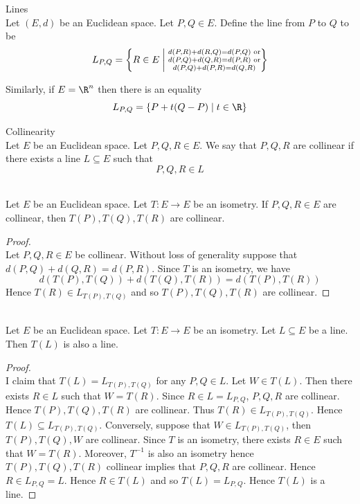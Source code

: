 \documentclass[a4paper]{article}
\begin{document}
\begin{defn}{Lines}{}\\
Let $(E,d)$ be an Euclidean space. Let $P,Q\in E$. Define the line from $P$ to $Q$ to be $$L_{P,Q}=\left\{R\in E\;\bigg{|}\;\substack{d(P,R)+d(R,Q)=d(P,Q)\text{ or}\\d(P,Q)+d(Q,R)=d(P,R)\text{ or}\\d(P,Q)+d(P,R)=d(Q,R)}\right\}$$
\end{defn}

Similarly, if $E=\R^n$ then there is an equality $$L_{P,Q}=\{P+t(Q-P)\;|\;t\in\R\}$$

\begin{defn}{Collinearity}{}\\
Let $E$ be an Euclidean space. Let $P,Q,R\in E$. We say that $P,Q,R$ are collinear if there exists a line $L\subseteq E$ such that $$P,Q,R\in L$$
\end{defn}

\begin{lmm}{}{}\\
Let $E$ be an Euclidean space. Let $T:E\to E$ be an isometry. If $P,Q,R\in E$ are collinear, then $T(P),T(Q),T(R)$ are collinear. 
\begin{proof}\\
Let $P,Q,R\in E$ be collinear. Without loss of generality suppose that $d(P,Q)+d(Q,R)=d(P,R)$. Since $T$ is an isometry, we have $$d(T(P),T(Q))+d(T(Q),T(R))=d(T(P),T(R))$$ Hence $T(R)\in L_{T(P),T(Q)}$ and so $T(P),T(Q),T(R)$ are collinear. 
\end{proof}
\end{lmm}

\begin{lmm}{}{}\\
Let $E$ be an Euclidean space. Let $T:E\to E$ be an isometry. Let $L\subseteq E$ be a line. Then $T(L)$ is also a line. 
\begin{proof}\\
I claim that $T(L)=L_{T(P),T(Q)}$ for any $P,Q\in L$. Let $W\in T(L)$. Then there exists $R\in L$ such that $W=T(R)$. Since $R\in L=L_{P,Q}$, $P,Q,R$ are collinear. Hence $T(P),T(Q),T(R)$ are collinear. Thus $T(R)\in L_{T(P),T(Q)}$. Hence $T(L)\subseteq L_{T(P),T(Q)}$. Conversely, suppose that $W\in L_{T(P),T(Q)}$, then $T(P),T(Q),W$ are collinear. Since $T$ is an isometry, there exists $R\in E$ such that $W=T(R)$. Moreover, $T^{-1}$ is also an isometry hence $T(P),T(Q),T(R)$ collinear implies that $P,Q,R$ are collinear. Hence $R\in L_{P,Q}=L$. Hence $R\in T(L)$ and so $T(L)=L_{P,Q}$. Hence $T(L)$ is a line. 
\end{proof}
\end{lmm}
\end{document}
